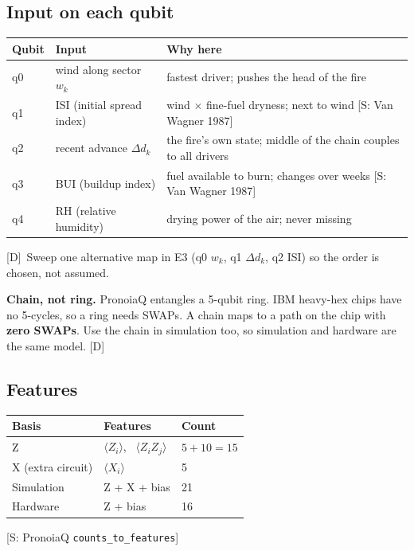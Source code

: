 \documentclass[11pt,a4paper]{article}
\newcommand{\tagbox}[2]{{\footnotesize\color{#1}\textsf{[#2]}}}
\newcommand{\supp}[1]{\tagbox{ForestGreen!70!black}{S: #1}}  %
\newcommand{\ours}{\tagbox{NavyBlue}{D}}                      %
\newcommand{\code}[1]{\texttt{\small #1}}
\begin{document}
\subsection{Input on each qubit}
\begin{center}\small
\begin{tabularx}{\linewidth}{@{}l l Y@{}}
\toprule
\textbf{Qubit} & \textbf{Input} & \textbf{Why here}\\
\midrule
q0 & wind along sector $w_k$ & fastest driver; pushes the head of the fire\\
q1 & ISI (initial spread index) & wind $\times$ fine-fuel dryness; next to wind \supp{Van Wagner 1987}\\
q2 & recent advance $\Delta d_k$ & the fire's own state; middle of the chain couples to all drivers\\
q3 & BUI (buildup index) & fuel available to burn; changes over weeks \supp{Van Wagner 1987}\\
q4 & RH (relative humidity) & drying power of the air; never missing\\
\bottomrule
\end{tabularx}
\end{center}
\ours\ Sweep one alternative map in E3 (q0 $w_k$, q1 $\Delta d_k$, q2 ISI) so the order is chosen, not assumed.

\begin{decision}
\textbf{Chain, not ring.} PronoiaQ entangles a 5-qubit ring. IBM heavy-hex chips have no 5-cycles, so a ring
needs SWAPs. A chain maps to a path on the chip with \textbf{zero SWAPs}. Use the chain in simulation too, so
simulation and hardware are the same model. \ours
\end{decision}

\subsection{Features}
\begin{center}\small
\begin{tabular}{@{}lll@{}}
\toprule
\textbf{Basis} & \textbf{Features} & \textbf{Count}\\
\midrule
Z & $\langle Z_i\rangle$, \ $\langle Z_iZ_j\rangle$ & $5+10=15$\\
X (extra circuit) & $\langle X_i\rangle$ & 5\\
\midrule
Simulation & Z + X + bias & 21\\
Hardware & Z + bias & 16\\
\bottomrule
\end{tabular}
\end{center}
\supp{PronoiaQ \code{counts\_to\_features}}
\end{document}
